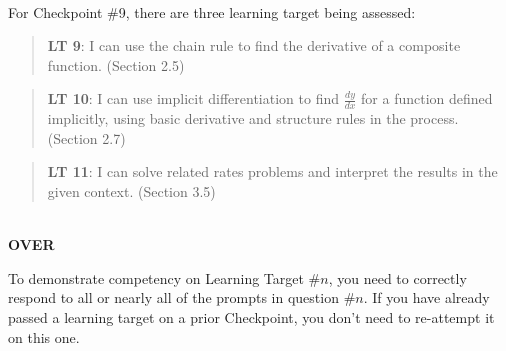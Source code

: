 \documentclass[11 pt]{article}
\begin{document}
\noindent \hrulefill \\

 For Checkpoint \#9, there are three learning target being assessed: 

\begin{quote}
{\bf LT 9}: I can use the chain rule to find the derivative of a composite function. (Section 2.5) 
\end{quote}

\begin{quote}
{\bf LT 10}:  I can use implicit differentiation to find $\frac{dy}{dx}$ for a function defined implicitly, using basic derivative and structure rules in the process.  (Section 2.7)
\end{quote}

\begin{quote}
{\bf LT 11}:  I can solve related rates problems and interpret the results in the given context. (Section 3.5)
\end{quote}


\noindent \hrulefill \\

\vfill \hfill {\bf OVER} 

\pagebreak


\noindent To demonstrate competency on Learning Target \#$n$, you need to correctly respond to all or nearly all of the prompts in question \#$n$.  If you have already passed a learning target on a prior Checkpoint, you don't need to re-attempt it on this one.
  
\end{document}
